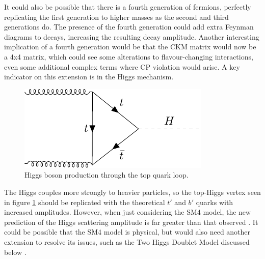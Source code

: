 \documentclass[a4paper,12pt]{article}
\begin{document}
It could also be possible that there is a fourth generation of fermions, perfectly replicating the first generation to higher masses as the second and third generations do. 
The presence of the fourth generation could add extra Feynman diagrams to decays, increasing the resulting decay amplitude. 
Another interesting implication of a fourth generation would be that the CKM matrix would now be a 4x4 matrix, which could see some alterations to flavour-changing interactions, even some additional complex terms where CP violation would arise. 
A key indicator on this extension is in the Higgs mechanism. 
\begin{figure}[H]
    \centering
    \includegraphics{../notes/higgs.pdf}
    \caption{\label{fig:higgs} Higgs boson production through the top quark loop.}
\end{figure}
The Higgs couples more strongly to heavier particles, so the top-Higgs vertex seen in figure \ref{fig:higgs} should be replicated with the theoretical $t'$ and $b'$ quarks with increased amplitudes. 
However, when just considering the SM4 model, the new prediction of the Higgs scattering amplitude is far greater than that observed \cite{r}. 
It could be possible that the SM4 model is physical, but would also need another extension to resolve its issues, such as the Two Higgs Doublet Model discussed below \cite{q}. 

%
\end{document}
